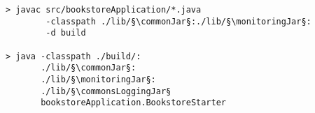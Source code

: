 \begin{lstlisting}
> javac src/bookstoreApplication/*.java
        -classpath ./lib/§\commonJar§:./lib/§\monitoringJar§:
        -d build

> java -classpath ./build/:
       ./lib/§\commonJar§:
       ./lib/§\monitoringJar§:
       ./lib/§\commonsLoggingJar§
       bookstoreApplication.BookstoreStarter 
\end{lstlisting}

